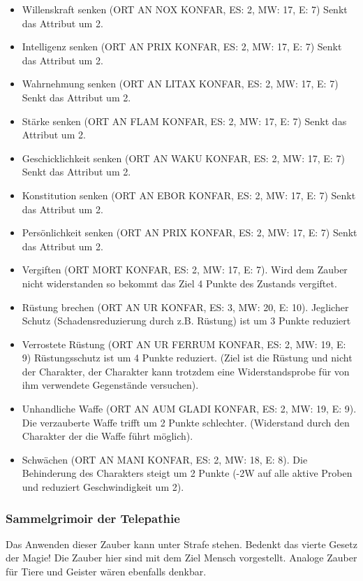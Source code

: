 \documentclass{article}
\begin{document}
\begin{itemize}
\item Willenskraft senken (ORT AN NOX KONFAR, ES: 2, MW: 17, E: 7) Senkt das Attribut um 2.
\item Intelligenz senken (ORT AN PRIX KONFAR, ES: 2, MW: 17, E: 7) Senkt das Attribut um 2.
\item Wahrnehmung senken (ORT AN LITAX KONFAR, ES: 2, MW: 17, E: 7) Senkt das Attribut um 2.
\item Stärke senken (ORT AN FLAM KONFAR, ES: 2, MW: 17, E: 7) Senkt das Attribut um 2.
\item Geschicklichkeit senken (ORT AN WAKU KONFAR, ES: 2, MW: 17, E: 7) Senkt das Attribut um 2.
\item Konstitution senken (ORT AN EBOR KONFAR, ES: 2, MW: 17, E: 7) Senkt das Attribut um 2.
\item Persönlichkeit senken (ORT AN PRIX KONFAR, ES: 2, MW: 17, E: 7) Senkt das Attribut um 2.
\item Vergiften (ORT MORT KONFAR, ES: 2, MW: 17, E: 7). Wird dem Zauber nicht widerstanden so bekommt das Ziel 4 Punkte des Zustands vergiftet.
\item Rüstung brechen (ORT AN UR KONFAR, ES: 3, MW: 20, E: 10). Jeglicher Schutz (Schadensreduzierung durch z.B. Rüstung) ist um 3 Punkte reduziert
\item Verrostete Rüstung (ORT AN UR FERRUM KONFAR, ES: 2, MW: 19, E: 9) Rüstungsschutz ist um 4 Punkte reduziert. (Ziel ist die Rüstung und nicht der Charakter, der Charakter kann trotzdem eine Widerstandsprobe für von ihm verwendete Gegenstände versuchen).
\item Unhandliche Waffe (ORT AN AUM GLADI KONFAR, ES: 2, MW: 19, E: 9). Die verzauberte Waffe trifft um 2 Punkte schlechter. (Widerstand durch den Charakter der die Waffe führt möglich).
\item Schwächen (ORT AN MANI KONFAR, ES: 2, MW: 18, E: 8). Die Behinderung des Charakters steigt um 2 Punkte (-2W auf alle aktive Proben und reduziert Geschwindigkeit um 2).
\end{itemize}

\subsubsection{Sammelgrimoir der Telepathie}

Das Anwenden dieser Zauber kann unter Strafe stehen. Bedenkt das vierte Gesetz der Magie! Die Zauber hier sind mit
dem Ziel Mensch vorgestellt. Analoge Zauber für Tiere und Geister wären ebenfalls denkbar.
\end{document}
